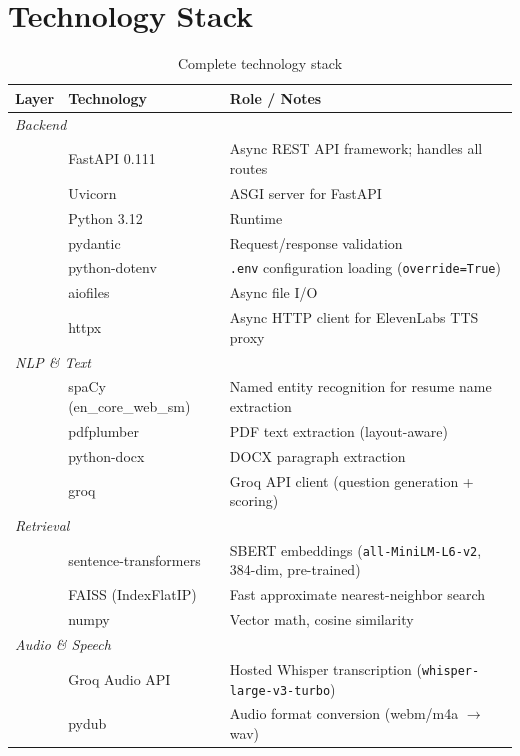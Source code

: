 \documentclass[12pt,a4paper]{article}
\begin{document}
\section{Technology Stack}

\begin{table}[H]
\centering
\caption{Complete technology stack}
\small
\begin{tabularx}{\textwidth}{l l X}
\toprule
\textbf{Layer} & \textbf{Technology} & \textbf{Role / Notes} \\
\midrule
\multicolumn{3}{l}{\textit{Backend}} \\
& FastAPI 0.111 & Async REST API framework; handles all routes \\
& Uvicorn & ASGI server for FastAPI \\
& Python 3.12 & Runtime \\
& pydantic & Request/response validation \\
& python-dotenv & \texttt{.env} configuration loading (\texttt{override=True}) \\
& aiofiles & Async file I/O \\
& httpx & Async HTTP client for ElevenLabs TTS proxy \\
\midrule
\multicolumn{3}{l}{\textit{NLP \& Text}} \\
& spaCy (en\_core\_web\_sm) & Named entity recognition for resume name extraction \\
& pdfplumber & PDF text extraction (layout-aware) \\
& python-docx & DOCX paragraph extraction \\
& groq & Groq API client (question generation + scoring) \\
\midrule
\multicolumn{3}{l}{\textit{Retrieval}} \\
& sentence-transformers & SBERT embeddings (\texttt{all-MiniLM-L6-v2}, 384-dim, pre-trained) \\
& FAISS (IndexFlatIP) & Fast approximate nearest-neighbor search \\
& numpy & Vector math, cosine similarity \\
\midrule
\multicolumn{3}{l}{\textit{Audio \& Speech}} \\
& Groq Audio API & Hosted Whisper transcription (\texttt{whisper-large-v3-turbo}) \\
& pydub & Audio format conversion (webm/m4a $\rightarrow$ wav) \\

\end{tabularx}
\end{table}
\end{document}
